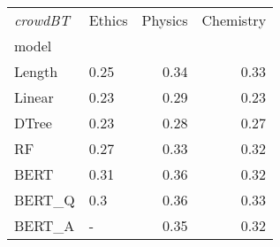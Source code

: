\begin{tabular}{llrr}
\toprule
\textit{crowdBT} & Ethics &  Physics &  Chemistry \\
model  &        &          &            \\
\midrule
Length &   0.25 &     0.34 &       0.33 \\
Linear &   0.23 &     0.29 &       0.23 \\
DTree  &   0.23 &     0.28 &       0.27 \\
RF     &   0.27 &     0.33 &       0.32 \\
BERT   &   0.31 &     0.36 &       0.32 \\
BERT\_Q &    0.3 &     0.36 &       0.33 \\
BERT\_A &      - &     0.35 &       0.32 \\
\bottomrule
\end{tabular}
